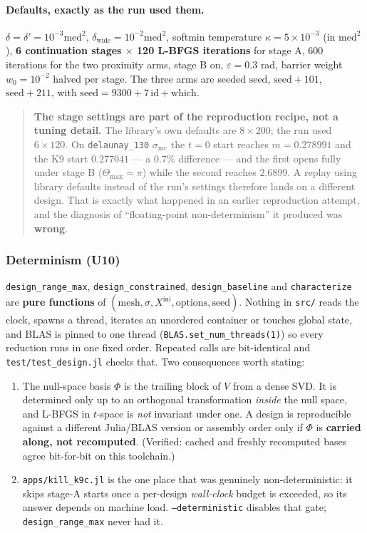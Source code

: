 \documentclass[11pt,a4paper]{article}
\theoremstyle{definition}
\newcommand{\Tmax}{\Theta_{\max}}
\newcommand{\file}[1]{\texttt{\small #1}}
\begin{document}
\paragraph{Defaults, exactly as the run used them.} $\delta=\delta'=10^{-3}\mathrm{med}^2$,
$\delta_{\mathrm{wide}}=10^{-2}\mathrm{med}^2$, softmin temperature
$\kappa=5\times10^{-3}$ (in $\mathrm{med}^2$), \textbf{6 continuation stages $\times$ 120
L-BFGS iterations} for stage A, 600 iterations for the two proximity arms, stage B on,
$\varepsilon=0.3$ rad, barrier weight $w_0=10^{-2}$ halved per stage. The three arms are
seeded $\mathrm{seed}$, $\mathrm{seed}+101$, $\mathrm{seed}+211$, with
$\mathrm{seed} = 9300+7\,\mathrm{id}+\mathrm{which}$.

\begin{quote}
\textbf{The stage settings are part of the reproduction recipe, not a tuning detail.} The
library's own defaults are $8\times200$; the run used $6\times120$. On
\file{delaunay\_130} $\sigma_{\mathrm{mc}}$ the $t=0$ start reaches $m=0.278991$ and the K9
start $0.277041$ --- a $0.7\%$ difference --- and the first opens fully under stage B
($\Tmax=\pi$) while the second reaches $2.6899$. A replay using library defaults instead of
the run's settings therefore lands on a different design. That is exactly what happened in an
earlier reproduction attempt, and the diagnosis of ``floating-point non-determinism'' it
produced was \textbf{wrong}.
\end{quote}

\subsubsection{Determinism (U10)}

\file{design\_range\_max}, \file{design\_constrained}, \file{design\_baseline} and
\file{characterize} are \textbf{pure functions} of $(\text{mesh},\sigma,X^{\mathrm{ini}},
\text{options},\text{seed})$. Nothing in \file{src/} reads the clock, spawns a thread,
iterates an unordered container or touches global state, and BLAS is pinned to one thread
(\file{BLAS.set\_num\_threads(1)}) so every reduction runs in one fixed order. Repeated calls are
bit-identical and \file{test/test\_design.jl} checks that. Two consequences worth stating:

\begin{enumerate}\itemsep2pt
\item The null-space basis $\Phi$ is the trailing block of $V$ from a dense SVD. It is
determined only up to an orthogonal transformation \emph{inside} the null space, and L-BFGS in
$t$-space is \emph{not} invariant under one. A design is reproducible against a different
Julia/BLAS version or assembly order only if $\Phi$ is \textbf{carried along, not recomputed}.
(Verified: cached and freshly recomputed bases agree bit-for-bit on this toolchain.)
\item \file{apps/kill\_k9c.jl} is the one place that was genuinely non-deterministic: it
skips stage-A starts once a per-design \emph{wall-clock} budget is exceeded, so its answer
depends on machine load. \file{--deterministic} disables that gate; \file{design\_range\_max}
never had it.
\end{enumerate}
\end{document}
